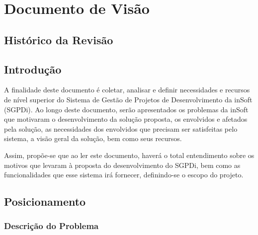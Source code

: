\chapter{Documento de Visão}
\label{sec:art-visao}
\section{Histórico da Revisão}

\section{Introdução}

A finalidade deste documento é coletar, analisar e definir necessidades e recursos de nível superior do Sistema de Gestão de Projetos de Desenvolvimento da inSoft (SGPDi). Ao longo deste documento, serão apresentados os problemas da inSoft que motivaram o desenvolvimento da solução proposta, os envolvidos e afetados pela solução, as necessidades dos envolvidos que precisam ser satisfeitas pelo sistema, a visão geral da solução, bem como seus recursos.

Assim, propõe-se que ao ler este documento, haverá o total entendimento sobre os motivos que levaram à proposta do desenvolvimento do SGPDi, bem como as funcionalidades que esse sistema irá fornecer, definindo-se o escopo do projeto.


  \section{Posicionamento}
    \subsection{Descrição do Problema}

